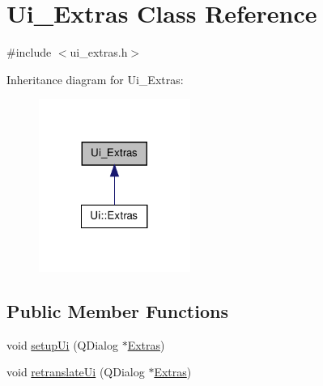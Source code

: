 \hypertarget{classUi__Extras}{
\section{Ui\_\-Extras Class Reference}
\label{classUi__Extras}
}


{\ttfamily \#include $<$ui\_\-extras.h$>$}



Inheritance diagram for Ui\_\-Extras:
\nopagebreak
\begin{figure}[H]
\begin{center}
\leavevmode
\includegraphics[width=140pt]{classUi__Extras__inherit__graph}
\end{center}
\end{figure}
\subsection*{Public Member Functions}
\begin{DoxyCompactItemize}
\item 
void \hyperlink{classUi__Extras_ae9081fb123d2b64bcb3fdf7301707af0}{setupUi} (QDialog $\ast$\hyperlink{classExtras}{Extras})
\item 
void \hyperlink{classUi__Extras_a91aeaa0a945f969c71283a2860f42495}{retranslateUi} (QDialog $\ast$\hyperlink{classExtras}{Extras})
\end{DoxyCompactItemize}
